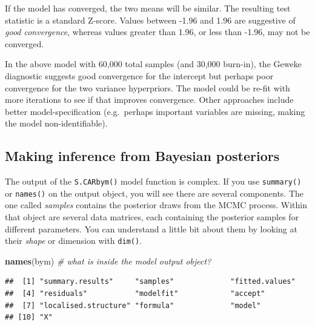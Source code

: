 \documentclass[
]{book}
\newenvironment{Shaded}{\begin{snugshade}}{\end{snugshade}}
\newcommand{\CommentTok}[1]{\textcolor[rgb]{0.56,0.35,0.01}{\textit{#1}}}
\newcommand{\FunctionTok}[1]{\textcolor[rgb]{0.13,0.29,0.53}{\textbf{#1}}}
\newcommand{\NormalTok}[1]{#1}
\newcommand{\SpecialCharTok}[1]{\textcolor[rgb]{0.81,0.36,0.00}{\textbf{#1}}}
\begin{document}
If the model has converged, the two means will be similar. The resulting test statistic is a standard Z-score. Values between -1.96 and 1.96 are suggestive of \emph{good convergence}, whereas values greater than 1.96, or less than -1.96, may not be converged.

In the above model with 60,000 total samples (and 30,000 burn-in), the Geweke diagnostic suggests good convergence for the intercept but perhaps poor convergence for the two variance hyperpriors. The model could be re-fit with more iterations to see if that improves convergence. Other approaches include better model-specification (e.g.~perhaps important variables are missing, making the model non-identifiable).

\hypertarget{making-inference-from-bayesian-posteriors}{%
\subsection{Making inference from Bayesian posteriors}\label{making-inference-from-bayesian-posteriors}}

The output of the \texttt{S.CARbym()} model function is complex. If you use \texttt{summary()} or \texttt{names()} on the output object, you will see there are several components. The one called \emph{samples} contains the posterior draws from the MCMC process. Within that object are several data matrices, each containing the posterior samples for different parameters. You can understand a little bit about them by looking at their \emph{shape} or dimension with \texttt{dim()}.

\begin{Shaded}
\begin{Highlighting}[]
\FunctionTok{names}\NormalTok{(bym)          }\CommentTok{\# what is inside the model output object?}
\end{Highlighting}
\end{Shaded}

\begin{verbatim}
##  [1] "summary.results"     "samples"             "fitted.values"      
##  [4] "residuals"           "modelfit"            "accept"             
##  [7] "localised.structure" "formula"             "model"              
## [10] "X"
\end{verbatim}

\begin{Shaded}
\end{Shaded}
\end{document}
